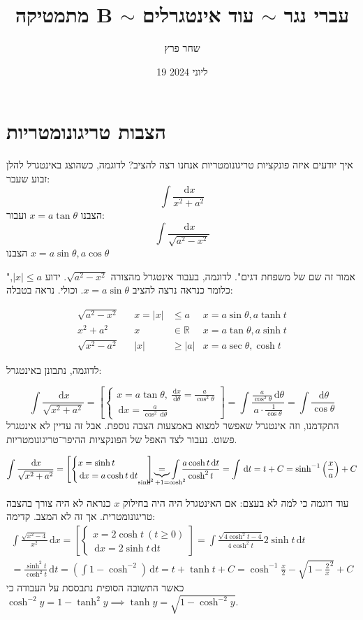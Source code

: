 \documentclass[]{article}
\author{שחר פרץ}
\title{מתמטיקה B $\sim$ עברי נגר $\sim$ עוד אינטגרלים}
\date{19 ליוני 2024}
\newcommand\R     {\mathbb{R}}
\newcommand\dx    {\,\mathrm{d}x}
\newcommand\dt    {\,\mathrm{d}t}
\newcommand\dtt   {\,\mathrm{d}\theta}
\newcommand\tth   {\theta}
\newcommand\op    {^{-1}}
\newcommand\cl [1]    {\left ( #1 \right )}
\newcommand\csb[1]    {\left [ #1 \right ]}
\begin{document}
	\maketitle
	\section{הצבות טריגונומטריות}
	איך יודעים איזה פונקציות טריגונומטריות אנחנו רצה להציב?
	לדוגמה, כשהוצג באינטגרל להלן זבוע שעבר: \[ \int \frac{\dx}{x^2 + a^2} \]הצבנו $x = a \tan \theta$ ועבור: 
	\[ \int \frac{\dx}{\sqrt{a^2 -  x^2}} \]
	הצבנו $x = a \sin \theta, a \cos \theta$
	
	"אמור זה שם של משפחת דגים". 
	לדוגמה, בעבור אינטגרל מהצורה $\sqrt{a^2 - x^2}$. ידוע $|x| \le a$, כלומר כנראה נרצה להציב $x = a \sin \theta$. וכולי. נראה בטבלה: 
	
	\begin{align}
		\sqrt{a^2 - x^2} && x=|x|& \le a & x = a \sin \theta,  a \tanh t \\
		x^2 + a^2 && x &\in \R & x = a \tan \theta, a \sinh t \\
		\sqrt{x^2 - a^2} && |x| &\ge |a| & x = a \sec \theta, \cosh t
	\end{align}
	
	
	לדוגמה, נתבונן באינטגרל: 
	
	\[ \int \frac{\dx}{\sqrt{x^2 + a^2}} = \csb{\begin{cases}
			x = a \tan \theta, \ \frac{\dx}{\dtt} = \frac{a}{\cos^2\tth} \\
			\dx = \frac{a}{\cos^2 \dtt}
	\end{cases}} = \int \frac{\frac{a}{\cos^2 \tth}\dtt}{a \cdot \frac{1}{\cos \tth}} = \int \frac{\dtt}{\cos \theta} \]
	התקדמנו, וזה אינטגרל שאפשר למצוא באמצעות הצבה נוספת. אבל זה עדיין לא אינטגרל פשוט. נעבור לצד האפל של הפונקציות ההיפר־טריגונומטריות. 
	
	\[ \int \frac{\dx}{\sqrt{x^2 + a^2}} = \csb{\begin{cases}
			x = \sinh t \\
			\dx = a \cosh t \dt
	\end{cases}} \underbrace{=}_{\mathclap{\sinh^2 + 1 = \cosh^2}} \int \frac{a \cosh t \dt }{\cosh^2 t} = \int \dt = t + C = \sinh\op \cl{\frac{x}{a}} + C \]
	
	עוד דוגמה כי למה לא בעצם: 
	אם האינטגרל היה היה בחילוק $x$ כנראה לא היה צורך בהצבה טריגונומטרית. אך זה לא המצב. קדימה: 
	\begin{gather*}
		\int \frac{\sqrt{x^2 - 4}}{x^2}\dx = \csb{\begin{cases}
				x = 2 \cosh t \ (t \ge 0) \\
				\dx = 2 \sinh t \dt
		\end{cases}} = \int \frac{\sqrt{4 \cosh^2 t - 4}}{4\cosh^2 t} 2 \sinh t \dt \\
	= \frac{\sinh^2 t}{\cosh^2 t} \dt = \cl{\int 1 - \cosh^{-2}} \dt = t + \tanh t + C = \cosh\op\frac{x}{2} - \sqrt{1 - \frac{2}{x}^2} + C
	\end{gather*}
כאשר התשובה הסופית נתבססת על העבודה כי $\cosh^{-2}y = 1 - \tanh^2 y \implies \tanh y = \sqrt{1 - \cosh^{-2}y}$. 
	
\end{document}
